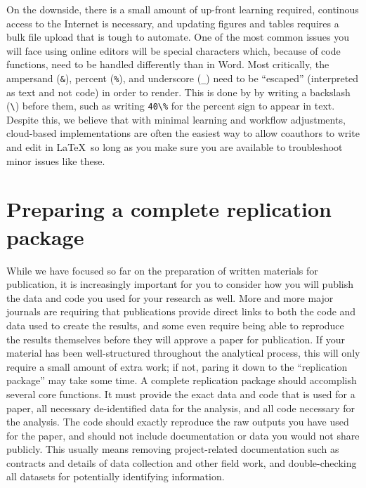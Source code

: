 On the downside, there is a small amount of up-front learning required,
continous access to the Internet is necessary,
and updating figures and tables requires a bulk file upload that is tough to automate.
One of the most common issues you will face using online editors will be special characters
which, because of code functions, need to be handled differently than in Word.
Most critically, the ampersand (\texttt{\&}), percent (\texttt{\%}), and underscore (\texttt{\_})
need to be ``escaped'' (interpreted as text and not code) in order to render.
This is done by by writing a backslash (\texttt{\textbackslash}) before them,
such as writing \texttt{40\textbackslash\%} for the percent sign to appear in text.
Despite this, we believe that with minimal learning and workflow adjustments,
cloud-based implementations are often the easiest way to allow coauthors to write and edit in \LaTeX\,
so long as you make sure you are available to troubleshoot minor issues like these.


\section{Preparing a complete replication package}

While we have focused so far on the preparation of written materials for publication,
it is increasingly important for you to consider how you will publish
the data and code you used for your research as well.
More and more major journals are requiring that publications
provide direct links to both the code and data used to create the results,
and some even require being able to reproduce the results themselves
before they will approve a paper for publication.
If your material has been well-structured throughout the analytical process,
this will only require a small amount of extra work;
if not, paring it down to the ``replication package'' may take some time.
A complete replication package should accomplish several core functions.
It must provide the exact data and code that is used for a paper,
all necessary de-identified data for the analysis,
and all code necessary for the analysis.
The code should exactly reproduce the raw outputs you have used for the paper,
and should not include documentation or data you would not share publicly.
This usually means removing project-related documentation such as contracts
and details of data collection and other field work,
and double-checking all datasets for potentially identifying information.


